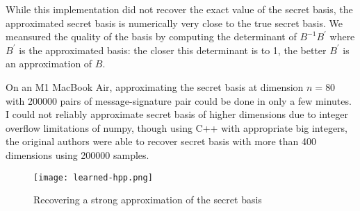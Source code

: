 While this implementation did not recover the exact value of the secret basis, the approximated secret basis is numerically very close to the true secret basis. We meansured the quality of the basis by computing the determinant of $B^{-1}B^\prime$ where $B^\prime$ is the approximated basis: the closer this determinant is to 1, the better $B^\prime$ is an approximation of $B$.

On an M1 MacBook Air, approximating the secret basis at dimension $n = 80$ with 200000 pairs of message-signature pair could be done in only a few minutes. I could not reliably approximate secret basis of higher dimensions due to integer overflow limitations of numpy, though using C++ with appropriate big integers, the original authors were able to recover secret basis with more than 400 dimensions using 200000 samples.

\begin{figure}[h]
    \centering
    \texttt{[image: learned-hpp.png]}
    \caption{Recovering a strong approximation of the secret basis}
\end{figure}